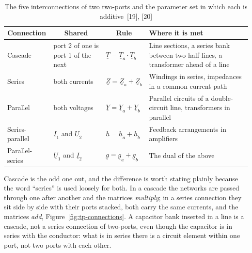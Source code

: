 \begin{table}[!ht]
  \centering
  \begin{tabularx}{\linewidth}{@{}l l l X@{}}
    \toprule
    \textbf{Connection} & \multicolumn{1}{c}{\textbf{Shared}}
      & \multicolumn{1}{c}{\textbf{Rule}} & \textbf{Where it is met} \\
    \midrule
    Cascade & port 2 of one is port 1 of the next
      & $\underline{T} = \underline{T}_a \cdot \underline{T}_b$
      & Line sections, a series bank between two half-lines, a transformer
        ahead of a line \\
    Series & both currents
      & $\underline{Z} = \underline{Z}_a + \underline{Z}_b$
      & Windings in series, impedances in a common current path \\
    Parallel & both voltages
      & $\underline{Y} = \underline{Y}_a + \underline{Y}_b$
      & Parallel circuits of a double-circuit line, transformers in
        parallel \\
    Series-parallel & $\underline{I}_1$ and $\underline{U}_2$
      & $\underline{h} = \underline{h}_a + \underline{h}_b$
      & Feedback arrangements in amplifiers \\
    Parallel-series & $\underline{U}_1$ and $\underline{I}_2$
      & $\underline{g} = \underline{g}_a + \underline{g}_b$
      & The dual of the above \\
    \bottomrule
  \end{tabularx}
  \caption{The five interconnections of two two-ports and the parameter set
           in which each is additive~[19], [20]}
  \label{tab:tp-interconnection}
\end{table}

Cascade is the odd one out, and the difference is worth stating plainly
because the word ``series'' is used loosely for both. In a cascade the
networks are passed through one after another and the matrices
\emph{multiply}; in a series connection they sit side by side with their
ports stacked, both carry the same currents, and the matrices \emph{add},
Figure~\ref{fig:tp-connections}.
A capacitor bank inserted in a line is a cascade, not a series connection of
two-ports, even though the capacitor is in series with the conductor: what
is in series there is a circuit element within one port, not two ports with
each other.


